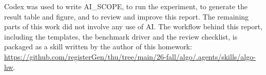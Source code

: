 \documentclass{article}
\begin{document}
Codex was used to write {{AI_SCOPE}}, to run the experiment, to generate the
result table and figure, and to review and improve this report. The remaining
parts of this work did not involve any use of AI. The workflow behind this
report, including the templates, the benchmark driver and the review
checklist, is packaged as a skill written by the author of this homework:
\url{https://github.com/registerGen/thu/tree/main/26-fall/algo/.agents/skills/algo-hw}.
\end{document}
